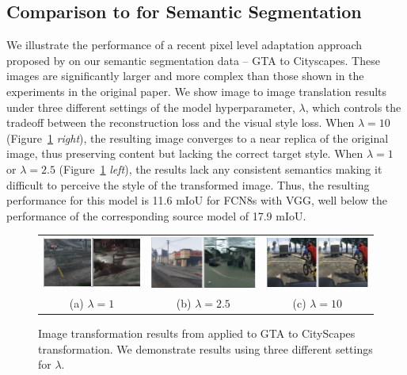 \subsection{Comparison to \citet{shrivastava_cvpr17} for Semantic Segmentation}
We illustrate the performance of a recent pixel level adaptation approach proposed by \citet{shrivastava_cvpr17} on our semantic segmentation data -- GTA to Cityscapes. These images are significantly larger and more complex than those shown in the experiments in the original paper. We show image to image translation results under three different settings of the model hyperparameter, $\lambda$, which controls the tradeoff between the reconstruction loss and the visual style loss. When $\lambda=10$ (Figure~\ref{fig:shrivastava} \textit{right}), the resulting image converges to a near replica of the original image, thus preserving content but lacking the correct target style. When $\lambda=1$ or $\lambda=2.5$ (Figure~\ref{fig:shrivastava} \textit{left}), the results lack any consistent semantics making it difficult to perceive the style of the transformed image. Thus, the resulting performance for this model is 11.6 mIoU for FCN8s with VGG, well below the performance of the corresponding source model of 17.9 mIoU. 
\begin{figure}
	\centering
	\begin{tabular}{ccc}
		\includegraphics[width=.32\linewidth]{figs/apple-paper-results/lambda1_ep10.png} &
		\includegraphics[width=.32\linewidth]{figs/apple-paper-results/lambda2p5_ep10.png}&
		\includegraphics[width=.32\linewidth]{figs/apple-paper-results/lambda10_ep10.png}\\
		(a) $\lambda = 1$ & (b) $\lambda = 2.5$ & (c) $\lambda = 10$	
\end{tabular}

\caption{Image transformation results from \citet{shrivastava_cvpr17} applied to GTA to CityScapes transformation. We demonstrate results using three different settings for $\lambda$.}
\label{fig:shrivastava}
\end{figure}

